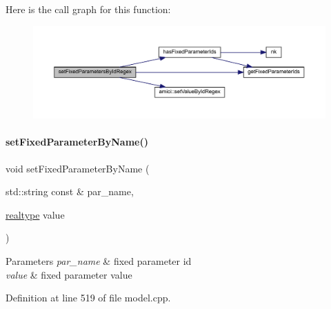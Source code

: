 Here is the call graph for this function\+:
\nopagebreak
\begin{figure}[H]
\begin{center}
\leavevmode
\includegraphics[width=350pt]{classamici_1_1_model_acda9b9debfd3d6ac77e2d27a48bfb5d6_cgraph}
\end{center}
\end{figure}
\mbox{\label{classamici_1_1_model_af1225439bd6deceb98b224e75a960800}} 
\paragraph{\texorpdfstring{set\+Fixed\+Parameter\+By\+Name()}{setFixedParameterByName()}}
{\footnotesize\ttfamily void set\+Fixed\+Parameter\+By\+Name (\begin{DoxyParamCaption}\item[{std\+::string const \&}]{par\+\_\+name,  }\item[{\mbox{\hyperlink{namespaceamici_a1bdce28051d6a53868f7ccbf5f2c14a3}{realtype}}}]{value }\end{DoxyParamCaption})}


\begin{DoxyParams}{Parameters}
{\em par\+\_\+name} & fixed parameter id \\
\hline
{\em value} & fixed parameter value \\
\hline
\end{DoxyParams}


Definition at line 519 of file model.\+cpp.

